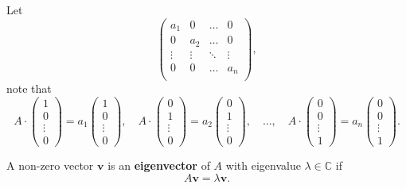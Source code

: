 \begin{remark}
    Let
    \[
        \begin{pmatrix}
            a_1 & 0 & \ldots & 0 \\
            0 & a_2 & \ldots & 0 \\
            \vdots & \vdots & \ddots & \vdots \\
            0 & 0 & \ldots & a_n \\
        \end{pmatrix}
        ,
    \]
    note that 
    \[
        A \cdot
        \begin{pmatrix}
            1 \\ 0 \\ \vdots \\ 0
        \end{pmatrix}
        = a_1
        \begin{pmatrix}
            1 \\ 0 \\ \vdots \\ 0
        \end{pmatrix}
        , \quad A \cdot
        \begin{pmatrix}
            0 \\ 1 \\ \vdots \\ 0
        \end{pmatrix}
        = a_2
        \begin{pmatrix}
            0 \\ 1 \\ \vdots \\ 0
        \end{pmatrix}
        , \quad \ldots, \quad A \cdot
        \begin{pmatrix}
            0 \\ 0 \\ \vdots \\ 1
        \end{pmatrix}
        = a_n
        \begin{pmatrix}
            0 \\ 0 \\ \vdots \\ 1
        \end{pmatrix}
        .
    \]
\end{remark}

\begin{definition}[Eigenvector]
    A non-zero vector $\bm{v}$ is an \textbf{eigenvector} of $A$ with eigenvalue $\lambda \in \mathbb{C}$ if \[ A \bm{v} = \lambda \bm{v}. \]
\end{definition}

